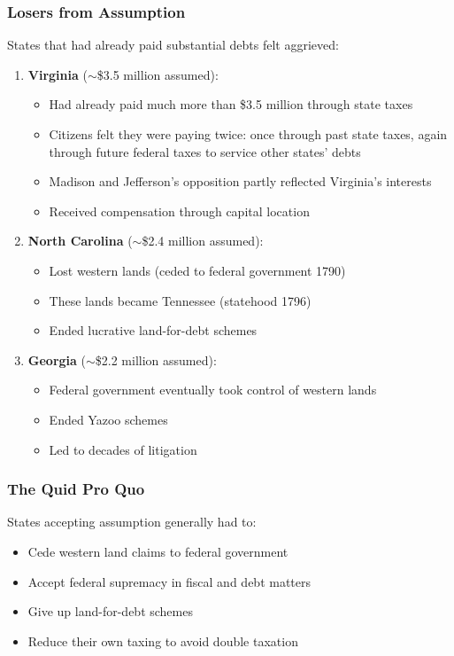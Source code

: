 \documentclass[12pt]{article}
\begin{document}
\subsubsection{Losers from Assumption}

States that had already paid substantial debts felt aggrieved:

\begin{enumerate}
\item \textbf{Virginia} ($\sim$\$3.5 million assumed):
\begin{itemize}
\item Had already paid much more than \$3.5 million through state taxes
\item Citizens felt they were paying twice: once through past state taxes, again through future federal taxes to service other states' debts
\item Madison and Jefferson's opposition partly reflected Virginia's interests
\item Received compensation through capital location
\end{itemize}

\item \textbf{North Carolina} ($\sim$\$2.4 million assumed):
\begin{itemize}
\item Lost western lands (ceded to federal government 1790)
\item These lands became Tennessee (statehood 1796)
\item Ended lucrative land-for-debt schemes
\end{itemize}

\item \textbf{Georgia} ($\sim$\$2.2 million assumed):
\begin{itemize}
\item Federal government eventually took control of western lands
\item Ended Yazoo schemes
\item Led to decades of litigation
\end{itemize}
\end{enumerate}

\subsubsection{The Quid Pro Quo}

States accepting assumption generally had to:
\begin{itemize}
\item Cede western land claims to federal government
\item Accept federal supremacy in fiscal and debt matters
\item Give up land-for-debt schemes
\item Reduce their own taxing to avoid double taxation
\end{itemize}
\end{document}
